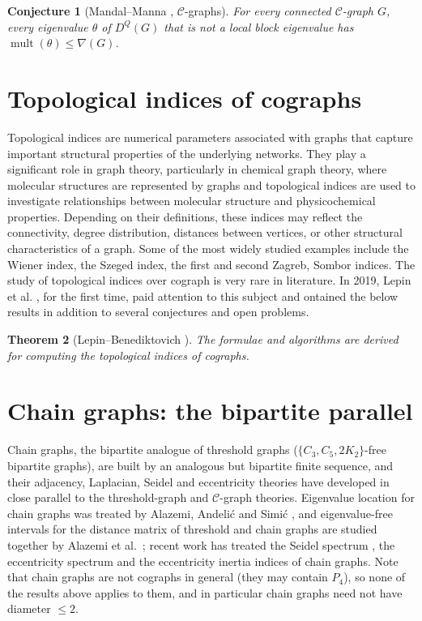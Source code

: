 \documentclass[11pt]{article}
\theoremstyle{plain}
\newtheorem{theorem}{Theorem}[section]
\newtheorem{conjecture}[theorem]{Conjecture}
\theoremstyle{definition}
\theoremstyle{remark}
\begin{document}
	\begin{conjecture}[Mandal--Manna \cite{MandalManna2026DLDQ}, $\mathcal C$-graphs]
		\label{conj:CDQmult}
		For every connected $\mathcal C$-graph $G$, every eigenvalue $\theta$ of $D^Q(G)$ that is not a local block eigenvalue has $\operatorname{mult}(\theta)\le\nabla(G)$.
	\end{conjecture}
	
	\section{Topological indices of cographs}
	\label{sec:topology}
	Topological indices are numerical parameters associated with graphs that capture important structural properties of the underlying networks. They play a significant role in graph theory, particularly in chemical graph theory, where molecular structures are represented by graphs and topological indices are used to investigate relationships between molecular structure and physicochemical properties. Depending on their definitions, these indices may reflect the connectivity, degree distribution, distances between vertices, or other structural characteristics of a graph. Some of the most widely studied examples include the Wiener index, the Szeged index, the first and second Zagreb, Sombor indices. The study of topological indices over cograph is very rare in literature. In 2019, Lepin et al. \cite{Lepin2019}, for the first time, paid attention to this subject and ontained the below results in addition to several conjectures and open problems.
	
	\begin{theorem}[Lepin--Benediktovich \cite{Lepin2019}]
		
		The formulae and algorithms
		are derived for computing the topological indices of cographs.
	\end{theorem}
	
	
	
	\section{Chain graphs: the bipartite parallel}
	\label{sec:chain}
	
	Chain graphs, the bipartite analogue of threshold graphs ($\{C_3,C_5,2K_2\}$-free bipartite graphs), are built by an analogous but bipartite finite sequence, and their adjacency, Laplacian, Seidel and eccentricity theories have developed in close parallel to the threshold-graph and $\mathcal{C}$-graph theories. Eigenvalue location for chain graphs was treated by Alazemi, Andeli\'c and Simi\'c \cite{AlazemiAndelicSimic2016}, and eigenvalue-free intervals for the distance matrix of threshold and chain graphs are studied together by Alazemi et al.\ \cite{AlazemiEtAl2021cograph}; recent work has treated the Seidel spectrum \cite{XiongHou2024chain,MandalMehataraDas2022}, the eccentricity spectrum \cite{YaqiongXuezheng2025} and the eccentricity inertia indices \cite{HuangZhang2025} of chain graphs. Note that chain graphs are not cographs in general (they may contain $P_4$), so none of the results above applies to them, and in particular chain graphs need not have diameter $\le2$.
	
\end{document}

